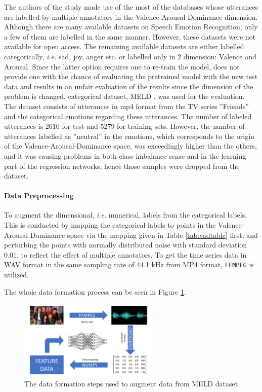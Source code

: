 \documentclass[a4paper,11pt]{article}
\begin{document}
The authors of the study made use of the most of the databases whose utterances are labelled by multiple annotators in the Valence-Arousal-Dominance dimension. 
Although there are many available datasets on Speech Emotion Recognition, only a few of them are labelled in the same manner. However, these datasets were not available for open access. The remaining available datasets are either labelled categorically, \textit{i.e.} sad, joy, anger etc. or labelled only in 2 dimension: Valence and Arousal. Since the latter option requires one to re-train the model, does not provide one with the chance of evaluating the pretrained model with the new test data and results in an unfair evaluation of the results since the dimension of the problem is changed, categorical dataset, MELD \cite{atmaja2020deep}, was used for the evaluation. The dataset consists of utterances in mp4 format from the TV series ''Friends'' and the categorical emotions regarding these utterances. The number of labeled utterances is 2610 for test and 5279 for training sets. However, the number of utterances labelled as ''neutral'' in the emotions, which corresponds to the origin of the Valence-Arousal-Dominance space, was exceedingly higher than the others, and it was causing problems in both class-imbalance sense and in the learning part of the regression networks, hence those samples were dropped from the dataset.

\paragraph{Data Preprocessing}

To augment the dimensional, \textit{i.e.} numerical, labels from the categorical labels. This is conducted by mapping the categorical labels to points in the Valence-Arousal-Dominance space via the mapping given in Table \ref{tab:vadtable} first, and perturbing the points with normally distributed noise with standard deviation 0.01, to reflect the effect of multiple annotators. To get the time series data in WAV format in the same sampling rate of 44.1 kHz from MP4 format, \texttt{FFMPEG} \cite{tomar2006converting} is utilized.   

The whole data formation process can be seen in Figure \ref{fig:dataformation}.

\begin{figure}[h]
\centering
\includegraphics[width=0.6\textwidth]{Presentation.png}
\caption{The data formation steps used to augment data from MELD dataset}\label{fig:dataformation}
\end{figure}
\end{document}
